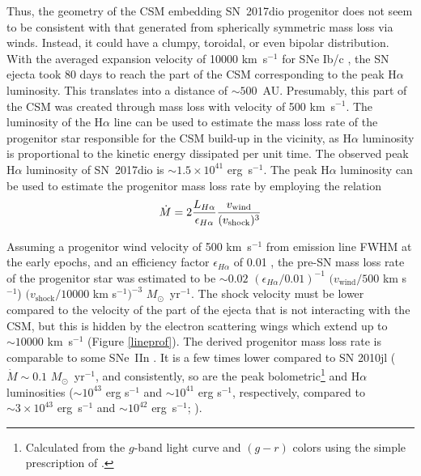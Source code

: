 \documentclass[twocolumn]{aastex61}
\begin{document}
Thus, the geometry of the CSM embedding SN~2017dio progenitor does not seem to be consistent with that generated from {spherically symmetric} mass loss via winds. 
Instead, it could have a clumpy, {toroidal}, or even bipolar distribution.
With the averaged {expansion} velocity of 10000 km~s$^{-1}$ {for SNe Ib/c} \citep[e.g.][]{cano13}, the SN ejecta took 80 days to reach the part of the CSM corresponding to the peak H$\alpha$ luminosity. This translates into a distance of $\sim500$~AU. 
Presumably, this part of the CSM was created through mass loss with velocity of 500 km~s$^{-1}$.
The luminosity of the H$\alpha$ line can be used to estimate the mass loss rate of the progenitor star responsible for the CSM build-up in the vicinity, as H$\alpha$ luminosity is proportional to the kinetic energy dissipated per unit time.
{The observed peak H$\alpha$ luminosity of SN~2017dio is $\sim 1.5 \times 10^{41}$ erg~s$^{-1}$.}
{The peak H$\alpha$ luminosity can be used to estimate the progenitor mass loss rate by employing the relation}
\begin{equation}
\dot{M} = 2 {{L_{H\alpha}}\over{\epsilon_{H\alpha}}} {{v_\textrm{wind}}\over{(v_\textrm{shock})^3}}
\end{equation}

{Assuming a progenitor wind velocity of 500 km~s$^{-1}$ from emission line FWHM at the early epochs, and an efficiency factor $\epsilon_{H\alpha}$ of 0.01 \citep{cf94}, the pre-SN mass loss rate of the progenitor star was estimated to be $\sim 0.02$ $(\epsilon_{H\alpha}/0.01)^{-1}$ $(v_\textrm{wind}/500$ km s$^{-1}$) $(v_\textrm{shock}/10 000$ km s$^{-1})^{-3}$ $M_\odot$~yr$^{-1}$. }
The shock velocity must be lower compared to the velocity of the part of the ejecta that is not interacting with the CSM, but this is hidden by the electron scattering wings which extend up to $\sim 10000$ km~s$^{-1}$ (Figure \ref{lineprof}). 
{The derived progenitor mass loss rate is comparable to some SNe~IIn \citep{kiewe12,taddia13}.
It is a few times lower compared to SN 2010jl ($\dot{M} \sim 0.1$ $M_\odot$~yr$^{-1}$, and consistently, so are the peak bolometric\footnote{{Calculated from the $g$-band light curve and $(g-r)$ colors using the simple prescription of \citet{lyman14}.}} 
and H$\alpha$ luminosities ($\sim10^{43}$ erg s$^{-1}$ and $\sim 10^{41}$ erg s$^{-1}$, respectively, compared to $\sim 3\times10^{43}$ erg~s$^{-1}$ and $\sim 10^{42}$ erg~s$^{-1}$; \citealt{fransson14}).
}
\end{document}
